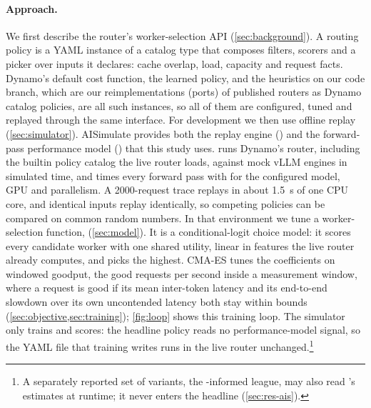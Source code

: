 \paragraph{Approach.}
We first describe the router's worker-selection API (\cref{sec:background}). A routing policy is a
YAML instance of a catalog type that composes filters, scorers and a picker over inputs it declares:
cache overlap, load, capacity and request facts. Dynamo's default cost function, the learned policy,
and the heuristics on our code branch, which are our reimplementations (ports) of published routers
as Dynamo catalog policies, are all such instances, so all of them are configured, tuned and
replayed through the same interface.
For development we then use offline replay (\cref{sec:simulator}). AISimulate provides both the
replay engine (\aisim{}) and the forward-pass performance model (\ais{}) that this study uses.
\aisim{} runs Dynamo's router, including the builtin policy catalog the live router loads, against
mock vLLM engines in simulated time, and times every forward pass with \ais{} for the configured
model, GPU and parallelism. A \num{2000}-request trace replays in about \SI{1.5}{s} of one CPU
core, and identical inputs replay identically, so competing policies can be compared on common
random numbers.
In that environment we tune a worker-selection function, \lc{} (\cref{sec:model}). It is a
conditional-logit choice model: it scores every candidate worker with one shared utility, linear
in features the live router already computes, and picks the highest. CMA-ES tunes the coefficients
on windowed goodput, the good requests per second inside a measurement window, where a request is
good if its mean inter-token latency and its end-to-end slowdown over its own uncontended latency
both stay within bounds (\cref{sec:objective,sec:training}); \cref{fig:loop} shows this training
loop. The simulator only trains and scores:
the headline policy reads no performance-model signal, so the YAML file that training writes runs
in the live router unchanged.\footnote{A separately reported set of variants, the \ais{}-informed
  league, may also read \ais{}'s estimates at runtime; it never enters the headline
  (\cref{sec:res-ais}).}

